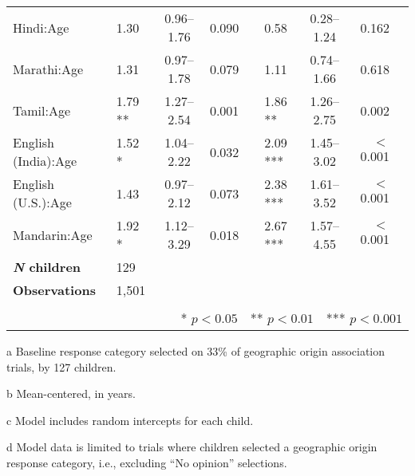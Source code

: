 \begin{table*}[t]
\begin{threeparttable}
\begin{tabular}{llcrclcrc}
Hindi:Age\tnote{b} & 1.30 & 0.96--1.76 & 0.090 &  & 0.58 & 0.28--1.24 & 0.162 &  \\ 

Marathi:Age\tnote{b} & 1.31 & 0.97--1.78 & 0.079 &  & 1.11 & 0.74--1.66 & 0.618 &  \\ 
  
Tamil:Age\tnote{b} & 1.79 ** & 1.27--2.54 & 0.001 & & 1.86 ** & 1.26--2.75 & 0.002 & \\ 
  
English (India):Age\tnote{b} & 1.52 * & 1.04--2.22 & 0.032 & & 2.09 *** & 1.45--3.02 & $<$0.001 & \\ 
  
English (U.S.):Age\tnote{b} & 1.43 & 0.97--2.12 & 0.073 &  & 2.38 *** & 1.61--3.52 & $<$0.001 & \\ 
  
Mandarin:Age\tnote{b} & 1.92 * & 1.12--3.29 & 0.018 & & 2.67 *** & 1.57--4.55 & $<$0.001 & \\ 

\midrule
\bfseries{\textit{N} children}\tnote{c} & 129 & & & & & & & \\ 
\textbf{Observations}\tnote{d} & 1,501 & & & & & & & \\ 
\bottomrule\\[-.75em]
\multicolumn{9}{r}{* $p<0.05$~~** $p<0.01$~~*** $p<0.001$}\\
\end{tabular}
\begin{tablenotes}[flushleft]
    \item[a] Baseline response category selected on 33\% of geographic origin association trials, by 127 children. %
    \item[b] Mean-centered, in years.
    \item[c] Model includes random intercepts for each child.
    \item[d] Model data is limited to trials where children selected a geographic origin response category, i.e., excluding ``No opinion'' selections. 
\end{tablenotes}
\end{threeparttable}
\end{table*}
